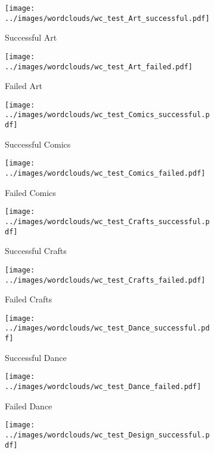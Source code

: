 \documentclass{article}
\begin{document}
\begin{figure}
  \begin{subfigure}[a]{0.2\linewidth}
    \centering\texttt{[image: ../images/wordclouds/wc\_test\_Art\_successful.pdf]}
    \caption{Successful Art}
    \label{fig:Art_s_test}
  \end{subfigure}
  \begin{subfigure}[a']{0.2\linewidth}
    \centering\texttt{[image: ../images/wordclouds/wc\_test\_Art\_failed.pdf]}
    \caption{Failed Art}
    \label{fig:Art_f_test}
  \end{subfigure}
  \begin{subfigure}[b]{0.2\linewidth}
    \centering\texttt{[image: ../images/wordclouds/wc\_test\_Comics\_successful.pdf]}
    \caption{Successful Comics}
    \label{fig:Comic_s_test}
  \end{subfigure} 
  \begin{subfigure}[b']{0.2\linewidth}
    \centering\texttt{[image: ../images/wordclouds/wc\_test\_Comics\_failed.pdf]}
    \caption{Failed Comics}
    \label{fig:Comic_f_test}
  \end{subfigure}
  \begin{subfigure}[c]{0.2\linewidth}
    \centering\texttt{[image: ../images/wordclouds/wc\_test\_Crafts\_successful.pdf]}
    \caption{Successful Crafts}
    \label{fig:Crafts_s_test}
  \end{subfigure}
    \begin{subfigure}[c']{0.2\linewidth}
    \centering\texttt{[image: ../images/wordclouds/wc\_test\_Crafts\_failed.pdf]}
    \caption{Failed Crafts}
    \label{fig:Crafts_f_test}
  \end{subfigure}
    \begin{subfigure}[d]{0.2\linewidth}
    \centering\texttt{[image: ../images/wordclouds/wc\_test\_Dance\_successful.pdf]}
    \caption{Successful Dance}
    \label{fig:Dance_s_test}
  \end{subfigure}
    \begin{subfigure}[d']{0.2\linewidth}
    \centering\texttt{[image: ../images/wordclouds/wc\_test\_Dance\_failed.pdf]}
    \caption{Failed Dance}
    \label{fig:Dance_f_test}
   \end{subfigure}
    \begin{subfigure}[e]{0.2\linewidth}
    \centering\texttt{[image: ../images/wordclouds/wc\_test\_Design\_successful.pdf]}

\end{subfigure}
\end{figure}
\end{document}
